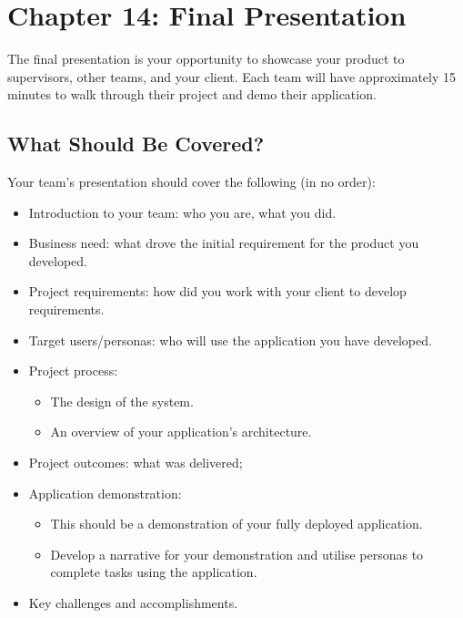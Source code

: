 \documentclass[letterpaper,10pt,english]{jupyterBook}
\begin{document}
\chapter{Chapter 14: Final Presentation}
\label{\detokenize{chapter_14/final_presentation:chapter-14-final-presentation}}\label{\detokenize{chapter_14/final_presentation::doc}}
\sphinxAtStartPar
The final presentation is your opportunity to showcase your product to
supervisors, other teams, and your client. Each team will have
approximately 15 minutes to walk through their project and demo their
application.


\section{What Should Be Covered?}
\label{\detokenize{chapter_14/final_presentation:what-should-be-covered}}
\sphinxAtStartPar
Your team’s presentation should cover the following (in no order):
\begin{itemize}
\item {} 
\sphinxAtStartPar
Introduction to your team: who you are, what you did.

\item {} 
\sphinxAtStartPar
Business need: what drove the initial requirement for the product
you developed.

\item {} 
\sphinxAtStartPar
Project requirements: how did you work with your client to develop
requirements.

\item {} 
\sphinxAtStartPar
Target users/personas: who will use the application you have
developed.

\item {} 
\sphinxAtStartPar
Project process:
\begin{itemize}
\item {} 
\sphinxAtStartPar
The design of the system.

\item {} 
\sphinxAtStartPar
An overview of your application’s architecture.

\end{itemize}

\item {} 
\sphinxAtStartPar
Project outcomes: what was delivered;

\item {} 
\sphinxAtStartPar
Application demonstration:
\begin{itemize}
\item {} 
\sphinxAtStartPar
This should be a demonstration of your fully deployed
application.

\item {} 
\sphinxAtStartPar
Develop a narrative for your demonstration and utilise personas
to complete tasks using the application.

\end{itemize}

\item {} 
\sphinxAtStartPar
Key challenges and accomplishments.

\end{itemize}
\end{document}

